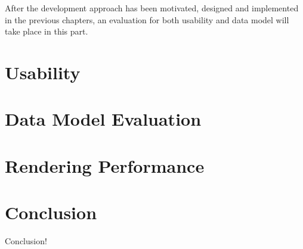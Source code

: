 After the development approach has been motivated, designed and implemented in the previous chapters, an evaluation for both usability and data model  will take place in this part.


\section{Usability}


\section{Data Model Evaluation}


\section{Rendering Performance}





\section{Conclusion}
Conclusion!
